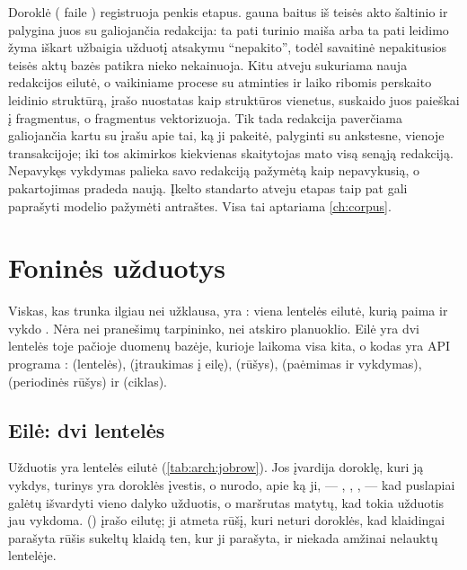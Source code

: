 Doroklė ( faile ) registruoja penkis etapus. 
gauna baitus iš teisės akto šaltinio ir palygina juos su galiojančia redakcija: ta pati turinio
maiša arba ta pati leidimo žyma iškart užbaigia užduotį atsakymu \enquote{nepakito}, todėl
savaitinė nepakitusios teisės aktų bazės patikra nieko nekainuoja. Kitu atveju sukuriama
nauja redakcijos eilutė, o  vaikiniame procese su atminties ir laiko ribomis
perskaito leidinio struktūrą,  įrašo nuostatas kaip struktūros vienetus,
 suskaido juos paieškai į fragmentus, o  fragmentus vektorizuoja. Tik
tada redakcija paverčiama galiojančia kartu su įrašu apie tai, ką ji pakeitė, palyginti su ankstesne,
vienoje transakcijoje; iki tos akimirkos kiekvienas skaitytojas mato visą senąją redakciją.
Nepavykęs vykdymas palieka savo redakciją pažymėtą kaip nepavykusią, o pakartojimas pradeda
naują. Įkelto standarto atveju  etapas taip pat gali paprašyti modelio pažymėti
antraštes. Visa tai aptariama \cref{ch:corpus}.

\section{Foninės užduotys}\label{sec:arch:jobs}

Viskas, kas trunka ilgiau nei užklausa, yra : viena lentelės eilutė, kurią
paima ir vykdo . Nėra nei pranešimų tarpininko, nei atskiro
planuoklio. Eilė yra dvi lentelės toje pačioje duomenų bazėje, kurioje laikoma visa kita, o
kodas yra API programa :  (lentelės), 
(įtraukimas į eilę),  (rūšys),  (paėmimas ir
vykdymas),  (periodinės rūšys) ir
 (ciklas).

\subsection{Eilė: dvi lentelės}

Užduotis yra  lentelės eilutė (\cref{tab:arch:jobrow}). Jos  įvardija
doroklę, kuri ją vykdys, turinys yra doroklės įvestis, o  nurodo, apie ką ji,
--- , , , --- kad puslapiai galėtų
išvardyti vieno dalyko užduotis, o maršrutas matytų, kad tokia užduotis jau vykdoma.
 () įrašo eilutę; ji atmeta rūšį, kuri neturi doroklės,
kad klaidingai parašyta rūšis sukeltų klaidą ten, kur ji parašyta, ir niekada amžinai
nelauktų lentelėje.

